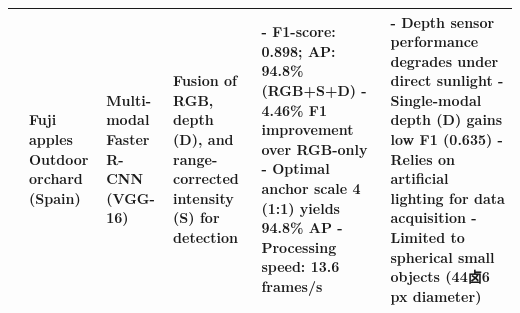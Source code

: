 \documentclass[a4paper,fleqn]{cas-dc}
\begin{document}
\begin{table}[htbp]
\begin{tabular}{@{}p{}p{}p{}p{}p{}p{}@{}}
	\cite{gene2019multi} \newline 2019 & Fuji apples \newline Outdoor orchard (Spain) & Multi-modal Faster R-CNN (VGG-16) & Fusion of RGB, depth (D), and range-corrected intensity (S) for detection & - F1-score: 0.898; AP: 94.8\% (RGB+S+D) \newline - 4.46\% F1 improvement over RGB-only \newline - Optimal anchor scale 4 (1:1) yields 94.8\% AP \newline - Processing speed: 13.6 frames/s & - Depth sensor performance degrades under direct sunlight \newline - Single-modal depth (D) gains low F1 (0.635) \newline - Relies on artificial lighting for data acquisition \newline - Limited to spherical small objects (44卤6 px diameter) \\ \midrule
	

\end{tabular}
\end{table}
\end{document}
